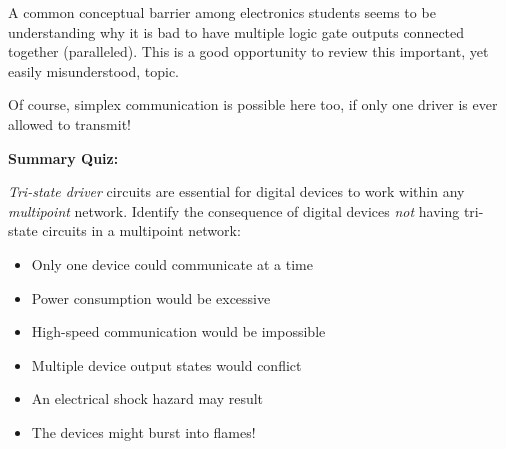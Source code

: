 \vskip 10pt

A common conceptual barrier among electronics students seems to be understanding why it is bad to have multiple logic gate outputs connected together (paralleled).  This is a good opportunity to review this important, yet easily misunderstood, topic.

\vskip 10pt

Of course, simplex communication is possible here too, if only one driver is ever allowed to transmit!

\vfil \eject

\noindent
{\bf Summary Quiz:}

{\it Tri-state driver} circuits are essential for digital devices to work within any {\it multipoint} network.  Identify the consequence of digital devices {\it not} having tri-state circuits in a multipoint network:

\begin{itemize}
\item{} Only one device could communicate at a time
\vskip 5pt 
\item{} Power consumption would be excessive
\vskip 5pt 
\item{} High-speed communication would be impossible
\vskip 5pt 
\item{} Multiple device output states would conflict
\vskip 5pt 
\item{} An electrical shock hazard may result 
\vskip 5pt 
\item{} The devices might burst into flames!
\end{itemize}





